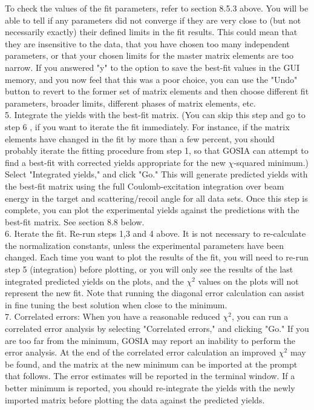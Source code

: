 \documentclass[10pt]{article}
\begin{document}
To check the values of the fit parameters, refer to section 8.5.3 above. You will be able to tell if any parameters did not converge if they are very close to (but not necessarily exactly) their defined limits in the fit results. This could mean that they are insensitive to the data, that you have chosen too many independent parameters, or that your chosen limits for the master matrix elements are too narrow. If you answered "y" to the option to save the best-fit values in the GUI memory, and you now feel that this was a poor choice, you can use the "Undo" button to revert to the former set of matrix elements and then choose different fit parameters, broader limits, different phases of matrix elements, etc.\\
5. Integrate the yields with the best-fit matrix. (You can skip this step and go to step 6 , if you want to iterate the fit immediately. For instance, if the matrix elements have changed in the fit by more than a few percent, you should probably iterate the fitting procedure from step 1, so that GOSIA can attempt to find a best-fit with corrected yields appropriate for the new $\chi$-squared minimum.) Select "Integrated yields," and click "Go." This will generate predicted yields with the best-fit matrix using the full Coulomb-excitation integration over beam energy in the target and scattering/recoil angle for all data sets. Once this step is complete, you can plot the experimental yields against the predictions with the best-fit matrix. See section 8.8 below.\\
6. Iterate the fit. Re-run steps 1,3 and 4 above. It is not necessary to re-calculate the normalization constants, unless the experimental parameters have been changed. Each time you want to plot the results of the fit, you will need to re-run step 5 (integration) before plotting, or you will only see the results of the last integrated predicted yields on the plots, and the $\chi^{2}$ values on the plots will not represent the new fit. Note that running the diagonal error calculation can assist in fine tuning the best solution when close to the minimum.\\
7. Correlated errors: When you have a reasonable reduced $\chi^{2}$, you can run a correlated error analysis by selecting "Correlated errors," and clicking "Go." If you are too far from the minimum, GOSIA may report an inability to perform the error analysis. At the end of the correlated error calculation an improved $\chi^{2}$ may be found, and the matrix at the new minimum can be imported at the prompt that follows. The error estimates will be reported in the terminal window. If a better minimum is reported, you should re-integrate the yields with the newly imported matrix before plotting the data against the predicted yields.
\end{document}
